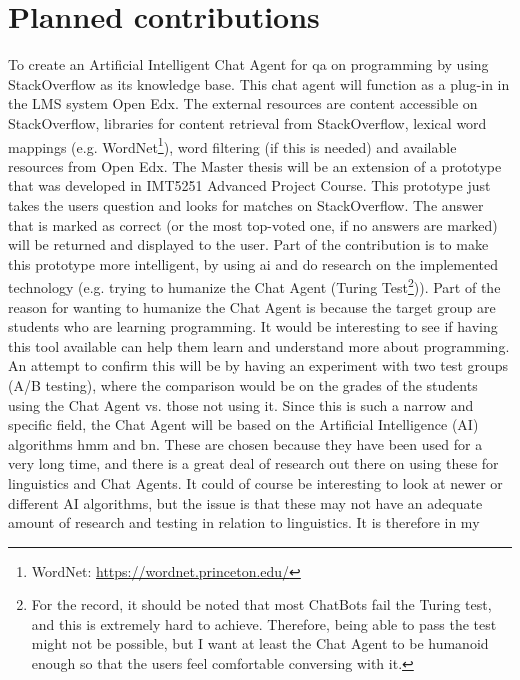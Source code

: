 \section{Planned contributions}
\label{chapter2:planned_contribution}
To create an Artificial Intelligent Chat Agent for \gls{qa} on programming by using StackOverflow as its knowledge base. This chat agent will function as a plug-in in the LMS system 
Open Edx. The external resources are content accessible on StackOverflow, libraries for content retrieval from StackOverflow, lexical word mappings (e.g. WordNet\footnote{WordNet: 
\url{https://wordnet.princeton.edu/}}), word filtering (if this is needed) and available resources from Open Edx.
\vspace{0.5em}\newline
The Master thesis will be an extension of a prototype that was developed in IMT5251 Advanced Project Course. This prototype just takes the users question and looks for matches 
on StackOverflow. The answer that is marked as correct (or the most top-voted one, if no answers are marked) will be returned and displayed to the user. Part of the contribution 
is to make this prototype more intelligent, by using \gls{ai} and do research on the implemented technology (e.g. trying to humanize the Chat Agent (Turing Test\footnote{For the 
	record, it 	should be noted that most ChatBots fail the Turing test, and this is extremely hard to achieve. Therefore, being able to pass the test might not be possible, but 
	I want at least the Chat Agent to be humanoid enough so that the users feel comfortable conversing with it.})). Part of the reason for wanting to humanize the Chat Agent is 
because the target group are students who are learning programming. It would be interesting to see if having this tool available can help them learn and understand more about 
programming. An attempt to confirm this will be by having an experiment with two test groups (A/B testing), where the comparison would be on the grades of the students using the 
Chat Agent vs. those not using it. 
\vspace{0.5em}\newline
Since this is such a narrow and specific field, the Chat Agent will be based on the Artificial Intelligence (AI) algorithms  \gls{hmm} and \gls{bn}. These are chosen 
because they have been used for a very long time, and there is a great deal of research out there on using these for linguistics and Chat Agents. It could of course be interesting 
to look at newer or different AI algorithms, but the issue is that these may not have an adequate amount of research and testing in relation to linguistics. It is therefore in my 
